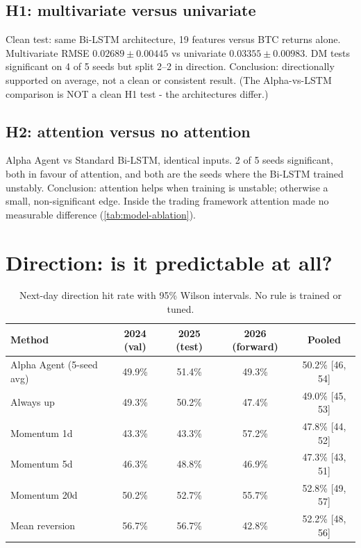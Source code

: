 \subsection{H1: multivariate versus univariate}
\begin{guide}
Clean test: same Bi-LSTM architecture, 19 features versus BTC returns alone. Multivariate RMSE $0.02689 \pm 0.00445$ vs univariate $0.03355 \pm 0.00983$. DM tests significant on 4 of 5 seeds but split 2--2 in direction. Conclusion: directionally supported on average, not a clean or consistent result. (The Alpha-vs-LSTM comparison is NOT a clean H1 test - the architectures differ.)
\end{guide}
\tbc{}

\subsection{H2: attention versus no attention}
\begin{guide}
Alpha Agent vs Standard Bi-LSTM, identical inputs. 2 of 5 seeds significant, both in favour of attention, and both are the seeds where the Bi-LSTM trained unstably. Conclusion: attention helps when training is unstable; otherwise a small, non-significant edge. Inside the trading framework attention made no measurable difference (\cref{tab:model-ablation}).
\end{guide}
\tbc{}

\section{Direction: is it predictable at all?}\label{sec:res-direction}

\begin{table}[ht]
  \centering
  \caption{Next-day direction hit rate with 95\% Wilson intervals. No rule is trained or tuned.}
  \label{tab:direction}
  \small
  \begin{tabular}{lcccc}
    \toprule
    Method & 2024 (val) & 2025 (test) & 2026 (forward) & Pooled \\
    \midrule
    Alpha Agent (5-seed avg) & 49.9\% & 51.4\% & 49.3\% & 50.2\% [46, 54] \\
    Always up                & 49.3\% & 50.2\% & 47.4\% & 49.0\% [45, 53] \\
    Momentum 1d              & 43.3\% & 43.3\% & 57.2\% & 47.8\% [44, 52] \\
    Momentum 5d              & 46.3\% & 48.8\% & 46.9\% & 47.3\% [43, 51] \\
    Momentum 20d             & 50.2\% & 52.7\% & 55.7\% & 52.8\% [49, 57] \\
    Mean reversion           & 56.7\% & 56.7\% & 42.8\% & 52.2\% [48, 56] \\
    \bottomrule
  \end{tabular}
\end{table}

